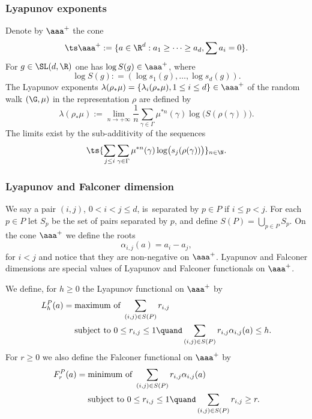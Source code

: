 \subsubsection{Lyapunov exponents}\label{lyapunovexp}
Denote by \(\aaa^+ \) the cone
\[
\ts \aaa^+ := \lbrace a \in \R^{d}: a_1 \ge \dots \ge a_d, \sum a_i = 0\rbrace.
\]
For \(g \in \SL(d,\R)\) one has \(\log S(g) \in \aaa^+\), where
\[
\log S(g): = (\log s_1(g),\ldots, \log s_d(g)). 
\]
The Lyapunov exponents \(\lambda(\rho_*\mu) = \{\lambda_i(\rho_\ast\mu), 1 \le i \le d \} \in \aaa^+\) of the random walk \((\G, \mu)\) in the representation \(\rho\) are defined by
\begin{equation}\label{exponents}
\lambda(\rho_*\mu):= \lim_{n \to +\infty} \frac{1}{n}\sum_{\gamma \in \Gamma}\mu^{\ast n}(\gamma)\log\bigl(S(\rho(\gamma))\bigr).\end{equation}
The limits exist by the sub-additivity of the sequences
\[
\ts \{\sum_{j\le i}\sum_{\gamma \in \Gamma}\mu^{\ast n}(\gamma)\log\bigl(s_j(\rho(\gamma))\bigr) \}_{n \in \N}.
\]

\subsubsection{Lyapunov and Falconer dimension}\label{Lyadimension}

We say a pair \((i,j)\), \(0\!<\!i\!<\!j\!\le\! d\), is~separated by \(p \in P\) if \(i \le p < j\). For each \(p \in P\) let \(S_p\) be the set of pairs separated by \(p\), and define \(S(P) = \bigcup_{p \in P}S_p\). On the cone \(\aaa^+\) we define the roots
\[
\alpha_{i,j}(a) = a_i - a_j,
\]
for \(i < j\) and notice that they are non-negative on \(\aaa^+\). Lyapunov and Falconer dimensions are special values of Lyapunov and Falconer functionals on \(\aaa^+\).

We define, for \(h \ge 0\) the Lyapunov functional on \(\aaa^+\) by
\begin{align*}L^P_h(a) &= \text{maximum of } \sum_{(i,j) \in S(P)}r_{i,j}
\\ &\hphantom{{}={}}\text{subject to }0 \le r_{i,j} \le 1
\quand \sum_{(i,j) \in S(P)} r_{i,j}\alpha_{i,j}(a) \le h.
\end{align*}
For \(r \ge 0\) we also define the Falconer functional on \(\aaa^+\) by
\begin{align*}F^P_r(a) &= \text{minimum of } \sum_{(i,j) \in S(P)}r_{i,j}\alpha_{i,j}(a)
\\ &\hphantom{{}={}}\text{subject to }0 \le r_{i,j} \le 1
\quand \sum_{(i,j) \in S(P)} r_{i,j} \ge r.
\end{align*}

